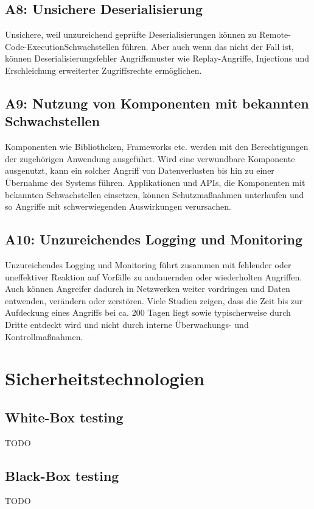 \documentclass[12pt,oneside,a4paper,parskip]{scrbook}
\begin{document}
\subsection{A8: Unsichere Deserialisierung}
Unsichere, weil unzureichend geprüfte Deserialisierungen können zu Remote-Code-ExecutionSchwachstellen
führen. Aber auch wenn das nicht der Fall ist, können Deserialisierungsfehler
Angriffsmuster wie Replay-Angriffe, Injections und Erschleichung erweiterter Zugriffsrechte
ermöglichen.

\subsection{A9: Nutzung von Komponenten mit bekannten Schwachstellen}
Komponenten wie Bibliotheken, Frameworks etc. werden mit den Berechtigungen der zugehörigen
Anwendung ausgeführt. Wird eine verwundbare Komponente ausgenutzt, kann ein solcher
Angriff von Datenverlusten bis hin zu einer Übernahme des Systems führen. Applikationen und
APIs, die Komponenten mit bekannten Schwachstellen einsetzen, können Schutzmaßnahmen
unterlaufen und so Angriffe mit schwerwiegenden Auswirkungen verursachen.

\subsection{A10: Unzureichendes Logging und Monitoring}
Unzureichendes Logging und Monitoring führt zusammen mit fehlender oder uneffektiver Reaktion
auf Vorfälle zu andauernden oder wiederholten Angriffen. Auch können Angreifer dadurch in
Netzwerken weiter vordringen und Daten entwenden, verändern oder zerstören. Viele Studien
zeigen, dass die Zeit bis zur Aufdeckung eines Angriffs bei ca. 200 Tagen liegt sowie typischerweise
durch Dritte entdeckt wird und nicht durch interne Überwachungs- und Kontrollmaßnahmen.

\section{Sicherheitstechnologien}
\subsection{White-Box testing}
TODO

\subsection{Black-Box testing}
TODO
\end{document}
